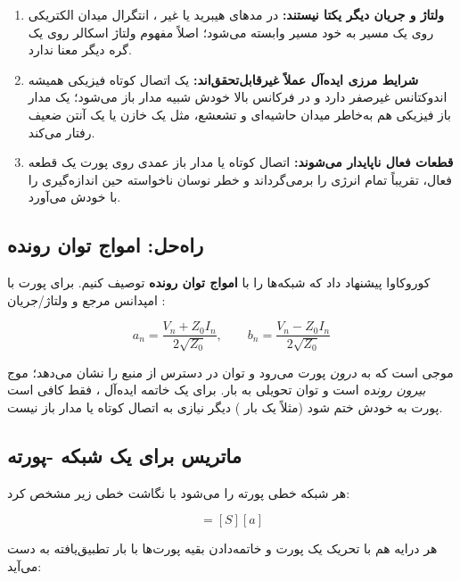 \documentclass[12pt]{article}
\begin{document}
	\begin{enumerate}
		\item \textbf{ولتاژ و جریان دیگر یکتا نیستند:} در مدهای هیبرید یا غیر ، انتگرال میدان الکتریکی روی یک مسیر به خود مسیر وابسته می‌شود؛ اصلاً مفهوم ولتاژ اسکالر روی یک گره دیگر معنا ندارد.
		\item \textbf{شرایط مرزی ایده‌آل عملاً غیرقابل‌تحقق‌اند:} یک اتصال کوتاه فیزیکی همیشه اندوکتانس غیرصفر دارد و در فرکانس بالا خودش شبیه مدار باز می‌شود؛ یک مدار باز فیزیکی هم به‌خاطر میدان حاشیه‌ای و تشعشع، مثل یک خازن یا یک آنتن ضعیف رفتار می‌کند.
		\item \textbf{قطعات فعال ناپایدار می‌شوند:} اتصال کوتاه یا مدار باز عمدی روی پورت یک قطعه فعال، تقریباً تمام انرژی را برمی‌گرداند و خطر نوسان ناخواسته حین اندازه‌گیری را با خودش می‌آورد.
	\end{enumerate}
	
	\subsection{راه‌حل: امواج توان رونده}
	
	کوروکاوا  پیشنهاد داد که شبکه‌ها را با \textbf{امواج توان رونده} توصیف کنیم. برای پورت  با امپدانس مرجع  و ولتاژ/جریان :
	
	\begin{equation}
		a_n = \frac{V_n + Z_0 I_n}{2\sqrt{Z_0}}, \qquad b_n = \frac{V_n - Z_0 I_n}{2\sqrt{Z_0}}
	\end{equation}
	
	 موجی است که به \textit{درون} پورت می‌رود و  توان در دسترس از منبع را نشان می‌دهد؛  موج \textit{بیرون رونده} است و  توان تحویلی به بار. برای یک خاتمه ایده‌آل ، فقط کافی است پورت به  خودش ختم شود (مثلاً یک بار ) دیگر نیازی به اتصال کوتاه یا مدار باز نیست.
	
	\subsection{ماتریس  برای یک شبکه -پورته}
	
	هر شبکه خطی  پورته را می‌شود با نگاشت خطی زیر مشخص کرد:
	
	\begin{equation}
		[b] = [S][a]
	\end{equation}
	
	هر درایه هم با تحریک یک پورت و خاتمه‌دادن بقیه پورت‌ها با بار تطبیق‌یافته به دست می‌آید:
	
\end{document}
